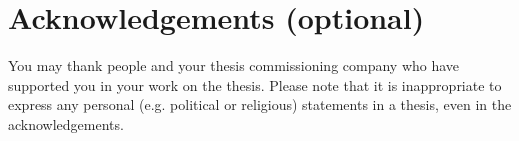 \section*{Acknowledgements (optional)}

You may thank people and your thesis commissioning company who have supported you in your work on the thesis. Please note that it is inappropriate to express any personal (e.g. political or religious) statements in a thesis, even in the acknowledgements.

\lipsum[1]

\clearpage %

